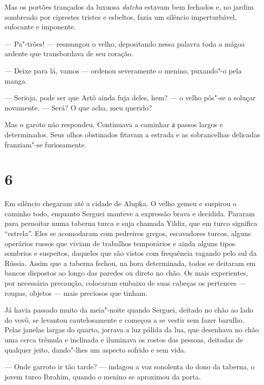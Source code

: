 Mas os portões trançados da luxuosa \emph{datcha} estavam bem fechados
e, no jardim sombreado por ciprestes tristes e esbeltos, fazia um
silêncio imperturbável, sufocante e imponente.

--- Pa"-trões! --- resmungou o velho, depositando nessa palavra toda a
mágoa ardente que transbordava de seu coração.

--- Deixe para lá, vamos --- ordenou severamente o menino, puxando"-o
pela manga.

--- Serioja, pode ser que Artô ainda fuja deles, hem? --- o velho pôs"-se
a soluçar novamente. --- Será? O que acha, meu querido?

Mas o garoto não respondeu. Continuava a caminhar а passos largos e
determinados. Seus olhos obstinados fitavam a estrada e as sobrancelhas
delicadas franziam"-se furiosamente.

\section{6}

Em silêncio chegaram até a cidade de Alupka. O velho gemeu e suspirou o
caminho todo, enquanto Serguei manteve a expressão brava e decidida.
Pararam para pernoitar numa taberna turca e suja chamada Yildiz, que em
turco significa ``estrela''. Eles se acomodaram com pedreiros gregos,
escavadores turcos, alguns operários russos que viviam de trabalhos
temporários e ainda alguns tipos sombrios e suspeitos, daqueles que são
vistos com frequência vagando pelo sul da Rússia. Assim que a taberna
fechou, na hora determinada, todos se deitaram em bancos dispostos ao
longo das paredes ou direto no chão. Os mais experientes, por necessária
precaução, colocaram embaixo de suas cabeças os pertences --- roupas,
objetos --- mais preciosos que tinham.

Já havia passado muito da meia"-noite quando Serguei, deitado no chão ao
lado do vovô, se levantou cautelosamente e começou a se vestir sem fazer
barulho. Pelas janelas largas do quarto, jorrava a luz pálida da lua,
que desenhava no chão uma cerca trêmula e inclinada e iluminava os
rostos das pessoas, deitadas de qualquer jeito, dando"-lhes um aspecto
sofrido e sem vida.

--- Onde garroto ir tão tarde? --- indagou a voz sonolenta do dono da
taberna, o jovem turco Ibrahim, quando o menino se aproximou da porta.


